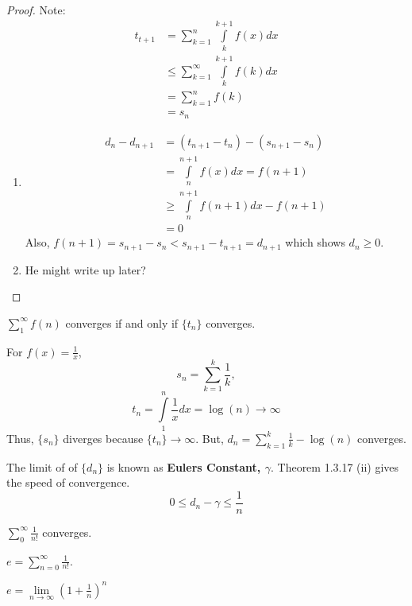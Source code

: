 \documentclass[11pt,fleqn]{book} %
\begin{document}
\begin{proof}
	Note: 
	\begin{align*}
	t_{t+1} &= \sum\limits^n_{k=1} \int\limits^{k+1}_k f(x) dx\\
	&\le \sum\limits^\infty_{k=1} \int\limits^{k+1}_k f(k) dx\\
	&= \sum\limits^n_{k=1} f(k)\\
	&= s_n	
	\end{align*}
	\begin{enumerate}[label = \alph*)]
		\item \begin{align*}
			d_n - d_{n+1} &= (t_{n+1} - t_n) - (s_{n+1} - s_n)\\
			&= \int\limits^{n+1}_n f(x) dx = f(n+1)\\
			&\ge \int\limits^{n+1}_n f(n+1) dx - f(n+1)\\
			&= 0
		\end{align*}
		Also, $f(n+1) = s_{n+1} - s_n < s_{n+1} - t_{n+1} = d_{n+1}$ which shows $d_n \ge 0$.
		\item He might write up later?
	\end{enumerate}
\end{proof}

\begin{corollary}
	$\sum\limits^\infty_1 f(n)$ converges if and only if $\{t_n\}$ converges. 

\end{corollary}

\begin{example}
For $f(x) = \frac{1}{x}$, 
$$s_n = \sum\limits^k_{k=1} \frac{1}{k},$$
$$t_n = \int\limits^n_1 \frac{1}{x} dx = \log(n) \rightarrow \infty$$	
Thus, $\{s_n\}$ diverges because $\{t_n\} \rightarrow \infty$. But, $d_n = \sum\limits^k_{k=1} \frac{1}{k} - \log(n)$ converges.  	
\end{example}

The limit of of $\{d_n\}$ is known as \textbf{Eulers Constant, $\gamma$}. Theorem 1.3.17 (ii) gives the speed of convergence. 
$$ 0 \le d_n - \gamma \le \frac{1}{n} $$

\begin{lemma}
	$\sum\limits^\infty_0 \frac{1}{n!}$ converges.
\end{lemma}

\begin{definition}[e]
	$e = \sum\limits^\infty_{n=0} \frac{1}{n!}$.
\end{definition}

\begin{theorem}
	$e = \lim\limits_{n\to\infty} (1+\frac{1}{n})^n$
\end{theorem}
\end{document}

